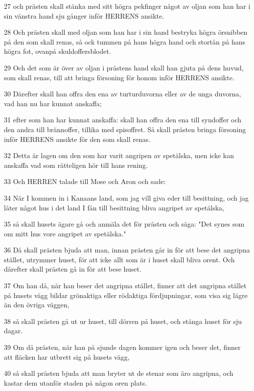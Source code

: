 \par 27 och prästen skall stänka med sitt högra pekfinger något av oljan som han har i sin vänstra hand sju gånger inför HERRENS ansikte.
\par 28 Och prästen skall med oljan som han har i sin hand bestryka högra örsnibben på den som skall renas, så ock tummen på hans högra hand och stortån på hans högra fot, ovanpå skuldoffersblodet.
\par 29 Och det som är över av oljan i prästens hand skall han gjuta på dens huvud, som skall renas, till att bringa försoning för honom inför HERRENS ansikte.
\par 30 Därefter skall han offra den ena av turturduvorna eller av de unga duvorna, vad han nu har kunnat anskaffa;
\par 31 efter som han har kunnat anskaffa: skall han offra den ena till syndoffer och den andra till brännoffer, tillika med spisoffret. Så skall prästen bringa försoning inför HERRENS ansikte för den som skall renas.
\par 32 Detta är lagen om den som har varit angripen av spetälska, men icke kan anskaffa vad som rätteligen hör till hans rening.
\par 33 Och HERREN talade till Mose och Aron och sade:
\par 34 När I kommen in i Kanaans land, som jag vill giva eder till besittning, och jag låter något hus i det land I fån till besittning bliva angripet av spetälska,
\par 35 så skall husets ägare gå och anmäla det för prästen och säga: "Det synes som om mitt hus vore angripet av spetälska."
\par 36 Då skall prästen bjuda att man, innan prästen går in för att bese det angripna stället, utrymmer huset, för att icke allt som är i huset skall bliva orent. Och därefter skall prästen gå in för att bese huset.
\par 37 Om han då, när han beser det angripna stället, finner att det angripna stället på husets vägg bildar grönaktiga eller rödaktiga fördjupningar, som visa sig lägre än den övriga väggen,
\par 38 så skall prästen gå ut ur huset, till dörren på huset, och stänga huset för sju dagar.
\par 39 Om då prästen, när han på sjunde dagen kommer igen och beser det, finner att fläcken har utbrett sig på husets vägg,
\par 40 så skall prästen bjuda att man bryter ut de stenar som äro angripna, och kastar dem utanför staden på någon oren plats.
